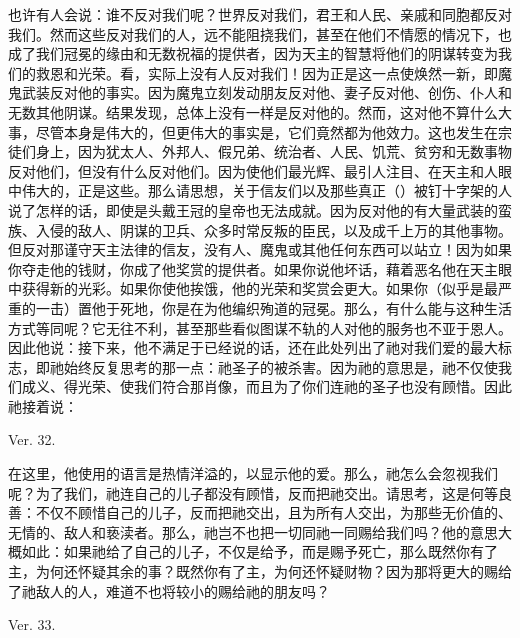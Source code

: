 也许有人会说：谁不反对我们呢？世界反对我们，君王和人民、亲戚和同胞都反对我们。然而这些反对我们的人，远不能阻挠我们，甚至在他们不情愿的情况下，也成了我们冠冕的缘由和无数祝福的提供者，因为天主的智慧将他们的阴谋转变为我们的救恩和光荣。看，实际上没有人反对我们！因为正是这一点使焕然一新，即魔鬼武装反对他的事实。因为魔鬼立刻发动朋友反对他、妻子反对他、创伤、仆人和无数其他阴谋。结果发现，总体上没有一样是反对他的。然而，这对他不算什么大事，尽管本身是伟大的，但更伟大的事实是，它们竟然都为他效力。这也发生在宗徒们身上，因为犹太人、外邦人、假兄弟、统治者、人民、饥荒、贫穷和无数事物反对他们，但没有什么反对他们。因为使他们最光辉、最引人注目、在天主和人眼中伟大的，正是这些。那么请思想，关于信友们以及那些真正（）被钉十字架的人说了怎样的话，即使是头戴王冠的皇帝也无法成就。因为反对他的有大量武装的蛮族、入侵的敌人、阴谋的卫兵、众多时常反叛的臣民，以及成千上万的其他事物。但反对那谨守天主法律的信友，没有人、魔鬼或其他任何东西可以站立！因为如果你夺走他的钱财，你成了他奖赏的提供者。如果你说他坏话，藉着恶名他在天主眼中获得新的光彩。如果你使他挨饿，他的光荣和奖赏会更大。如果你（似乎是最严重的一击）置他于死地，你是在为他编织殉道的冠冕。那么，有什么能与这种生活方式等同呢？它无往不利，甚至那些看似图谋不轨的人对他的服务也不亚于恩人。因此他说：接下来，他不满足于已经说的话，还在此处列出了祂对我们爱的最大标志，即祂始终反复思考的那一点：祂圣子的被杀害。因为祂的意思是，祂不仅使我们成义、得光荣、使我们符合那肖像，而且为了你们连祂的圣子也没有顾惜。因此祂接着说：\par

Ver. 32. \par

在这里，他使用的语言是热情洋溢的，以显示他的爱。那么，祂怎么会忽视我们呢？为了我们，祂连自己的儿子都没有顾惜，反而把祂交出。请思考，这是何等良善：不仅不顾惜自己的儿子，反而把祂交出，且为所有人交出，为那些无价值的、无情的、敌人和亵渎者。那么，祂岂不也把一切同祂一同赐给我们吗？他的意思大概如此：如果祂给了自己的儿子，不仅是给予，而是赐予死亡，那么既然你有了主，为何还怀疑其余的事？既然你有了主，为何还怀疑财物？因为那将更大的赐给了祂敌人的人，难道不也将较小的赐给祂的朋友吗？\par

Ver. 33. \par

